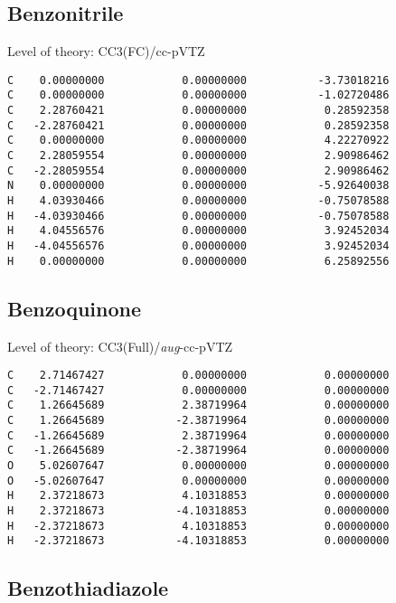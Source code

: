\documentclass[journal=jctcce,manuscript=article,layout=traditional]{achemso}
\newcommand{\TZ}{cc-pVTZ}
\newcommand{\AVTZ}{\emph{aug}-cc-pVTZ}
\begin{document}
\subsection*{Benzonitrile}

\begin{singlespace}
Level of theory: CC3(FC)/{\TZ}
\begin{verbatim}
C    0.00000000            0.00000000           -3.73018216
C    0.00000000            0.00000000           -1.02720486
C    2.28760421            0.00000000            0.28592358
C   -2.28760421            0.00000000            0.28592358
C    0.00000000            0.00000000            4.22270922
C    2.28059554            0.00000000            2.90986462
C   -2.28059554            0.00000000            2.90986462
N    0.00000000            0.00000000           -5.92640038
H    4.03930466            0.00000000           -0.75078588
H   -4.03930466            0.00000000           -0.75078588
H    4.04556576            0.00000000            3.92452034
H   -4.04556576            0.00000000            3.92452034
H    0.00000000            0.00000000            6.25892556
\end{verbatim}
\end{singlespace}

\subsection*{Benzoquinone}

\begin{singlespace}
Level of theory: CC3(Full)/{\AVTZ}
\begin{verbatim}
C    2.71467427            0.00000000            0.00000000
C   -2.71467427            0.00000000            0.00000000
C    1.26645689            2.38719964            0.00000000
C    1.26645689           -2.38719964            0.00000000
C   -1.26645689            2.38719964            0.00000000
C   -1.26645689           -2.38719964            0.00000000
O    5.02607647            0.00000000            0.00000000
O   -5.02607647            0.00000000            0.00000000
H    2.37218673            4.10318853            0.00000000
H    2.37218673           -4.10318853            0.00000000
H   -2.37218673            4.10318853            0.00000000
H   -2.37218673           -4.10318853            0.00000000
\end{verbatim}
\end{singlespace}

\subsection*{Benzothiadiazole}
\end{document}

